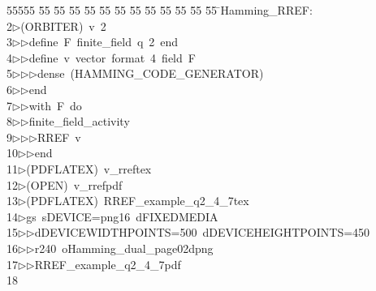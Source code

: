 %
%
\begin{tabbing}
55555 \= 55 \= 55 \= 55 \= 55 \= 55 \= 55 \= 55 \= 55 \= 55 \= 55 \= 55 \= 55 \= \>Hamming\_RREF:\\[0pt]
2\>$\triangleright$\>(ORBITER)\ v\ 2\ \\[0pt]
3\>$\triangleright$\>$\triangleright$\>define\ F\ finite\_field\ q\ 2\ end\ \\[0pt]
4\>$\triangleright$\>$\triangleright$\>define\ v\ vector\ format\ 4\ field\ F\ \\[0pt]
5\>$\triangleright$\>$\triangleright$\>$\triangleright$\>dense\ (HAMMING\_CODE\_GENERATOR)\ \\[0pt]
6\>$\triangleright$\>$\triangleright$\>end\ \\[0pt]
7\>$\triangleright$\>$\triangleright$\>with\ F\ do\ \\[0pt]
8\>$\triangleright$\>$\triangleright$\>finite\_field\_activity\ \\[0pt]
9\>$\triangleright$\>$\triangleright$\>$\triangleright$\>RREF\ v\ \\[0pt]
10\>$\triangleright$\>$\triangleright$\>end\\[0pt]
11\>$\triangleright$\>(PDFLATEX)\ v\_rreftex\\[0pt]
12\>$\triangleright$\>(OPEN)\ v\_rrefpdf\\[0pt]
13\>$\triangleright$\>(PDFLATEX)\ RREF\_example\_q2\_4\_7tex\\[0pt]
14\>$\triangleright$\>gs\ sDEVICE=png16\ dFIXEDMEDIA\ \\[0pt]
15\>$\triangleright$\>$\triangleright$\>dDEVICEWIDTHPOINTS=500\ dDEVICEHEIGHTPOINTS=450\ \\[0pt]
16\>$\triangleright$\>$\triangleright$\>r240\ oHamming\_dual\_page02dpng\ \\[0pt]
17\>$\triangleright$\>$\triangleright$\>RREF\_example\_q2\_4\_7pdf\\[0pt]
18\>\end{tabbing}
